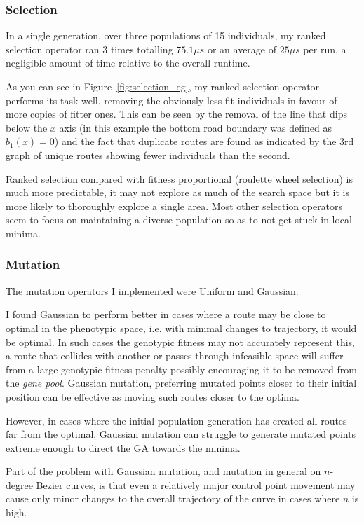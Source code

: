\subsubsection{Selection}

In a single generation, over three populations of 15 individuals, my ranked selection operator ran 3 times totalling $75.1\mu s$ or an average of $25 \mu s$ per run, a negligible amount of time relative to the overall runtime.

As you can see in Figure~\ref{fig:selection_eg}, my ranked selection operator performs its task well, removing the obviously less fit individuals in favour of more copies of  fitter ones. This can be seen by the removal of the line that dips below the $x$ axis (in this example the bottom road boundary was defined as $b_{1}(x) = 0 $) and the fact that duplicate routes are found as indicated by the 3rd graph of unique routes showing fewer individuals than the second.

Ranked selection compared with fitness proportional (roulette wheel selection) is much more predictable, it may not explore as much of the search space but it is more likely to thoroughly explore a single area. Most other selection operators seem to focus on maintaining a diverse population so as to not get stuck in local minima.

\subsubsection{Mutation}

The mutation operators I implemented were Uniform and Gaussian.

I found Gaussian to perform better in cases where a route may be close to optimal in the phenotypic space, i.e. with minimal changes to trajectory, it would be optimal. In such cases the genotypic fitness may not accurately represent this, a route that collides with another or passes through infeasible space will suffer from a large genotypic fitness penalty possibly encouraging it to be removed from the \textit{gene pool}. Gaussian mutation, preferring mutated points closer to their initial position can be effective as moving such routes closer to the optima.

However, in cases where the initial population generation has created all routes far from the optimal, Gaussian mutation can struggle to generate mutated points extreme enough to direct the GA towards the minima.

Part of the problem with Gaussian mutation, and mutation in general on $n$-degree Bezier curves, is that even a relatively major control point movement may cause only minor changes to the overall trajectory of the curve in cases where $n$ is high.

